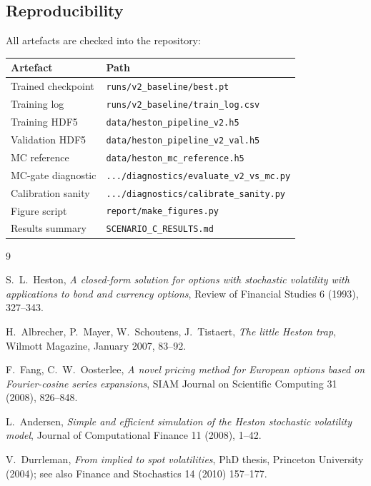 \documentclass[11pt,a4paper]{article}
\begin{document}
\subsection{Reproducibility}

All artefacts are checked into the repository:

\begin{tabular}{ll}
  \toprule
  \textbf{Artefact} & \textbf{Path} \\
  \midrule
  Trained checkpoint   & \texttt{runs/v2\_baseline/best.pt} \\
  Training log         & \texttt{runs/v2\_baseline/train\_log.csv} \\
  Training HDF5        & \texttt{data/heston\_pipeline\_v2.h5} \\
  Validation HDF5      & \texttt{data/heston\_pipeline\_v2\_val.h5} \\
  MC reference         & \texttt{data/heston\_mc\_reference.h5} \\
  MC-gate diagnostic   & \texttt{.../diagnostics/evaluate\_v2\_vs\_mc.py} \\
  Calibration sanity   & \texttt{.../diagnostics/calibrate\_sanity.py} \\
  Figure script        & \texttt{report/make\_figures.py} \\
  Results summary      & \texttt{SCENARIO\_C\_RESULTS.md} \\
  \bottomrule
\end{tabular}

\begin{thebibliography}{9}

S.~L.~Heston, \emph{A closed-form solution for options with stochastic
volatility with applications to bond and currency options},
Review of Financial Studies 6 (1993), 327--343.

H.~Albrecher, P.~Mayer, W.~Schoutens, J.~Tistaert,
\emph{The little Heston trap},
Wilmott Magazine, January 2007, 83--92.

F.~Fang, C.~W.~Oosterlee,
\emph{A novel pricing method for European options based on
  Fourier-cosine series expansions},
SIAM Journal on Scientific Computing 31 (2008), 826--848.

L.~Andersen,
\emph{Simple and efficient simulation of the Heston stochastic
volatility model},
Journal of Computational Finance 11 (2008), 1--42.

V.~Durrleman,
\emph{From implied to spot volatilities},
PhD thesis, Princeton University (2004); see also
Finance and Stochastics 14 (2010) 157--177.

\end{thebibliography}
\end{document}
